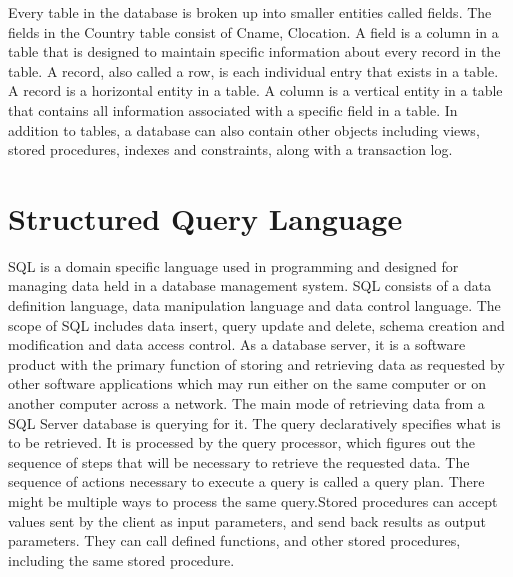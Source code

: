 \documentclass[12pt,a4paper]{report}
\begin{document}
Every table in the database is broken up into smaller entities called fields. The fields in the Country table consist of Cname, Clocation. A field is a column in a table that is designed to maintain specific information about every record in the table. A record, also called a row, is each individual entry that exists in a table. A record is a horizontal entity in a table. A column is a vertical entity in a table that contains all information associated with a specific field in a table. In addition to tables, a database can also contain other objects including views, stored procedures, indexes and constraints, along with a transaction log.


\section{Structured Query Language}

SQL is a domain specific language used in programming  and designed for managing data held in a database management system. SQL consists of a data definition language, data manipulation language and data control language. The scope of SQL includes data insert, query update and delete, schema creation and modification and data access control. As a database server, it is a software product with the primary function of storing and retrieving data as requested by other software applications which may run either on the same computer or on another computer across a network.
The main mode of retrieving data from a SQL Server database is querying for it. The query declaratively specifies what is to be retrieved. It is processed by the query processor, which figures out the sequence of steps that will be necessary to retrieve the requested data. The sequence of actions necessary to execute a query is called a query plan. There might be multiple ways to process the same query.Stored procedures can accept values sent by the client as input parameters, and send back results as output parameters. They can call defined functions, and other stored procedures, including the same stored procedure.
\end{document}
